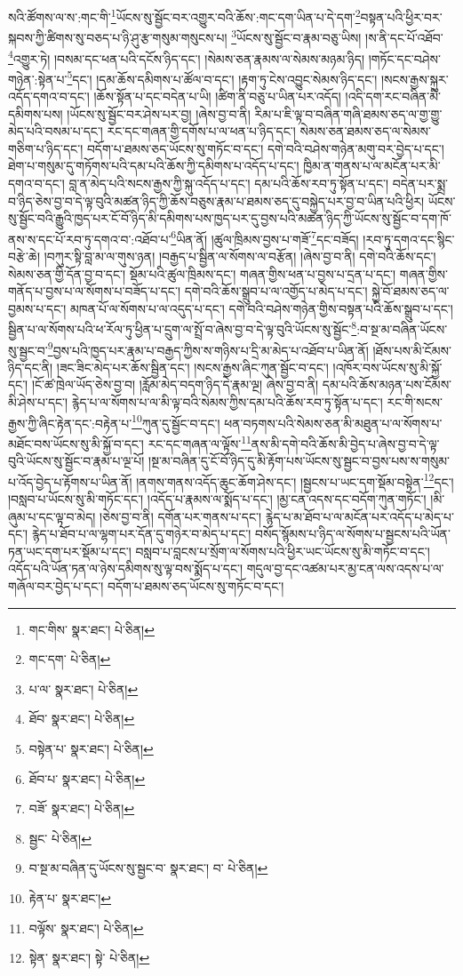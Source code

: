 སའི་ཚོགས་ལ་ས་:གང་གི་\footnote{གང་གིས་  སྣར་ཐང་།  པེ་ཅིན། }ཡོངས་སུ་སྦྱོང་བར་འགྱུར་བའི་ཆོས་:གང་དག་ཡིན་པ་དེ་དག་\footnote{གང་དག་  པེ་ཅིན། }བསྟན་པའི་ཕྱིར་བར་སྐབས་ཀྱི་ཚིགས་སུ་བཅད་པ་ཉི་ཤུ་རྩ་གསུམ་གསུངས་པ། \footnote{པ་ལ་  སྣར་ཐང་།  པེ་ཅིན། }ཡོངས་སུ་སྦྱོང་བ་རྣམ་བཅུ་ཡིས། །ས་ནི་དང་པོ་འཐོབ་\footnote{ཐོབ་  སྣར་ཐང་།  པེ་ཅིན། }འགྱུར་ཏེ། །བསམ་དང་ཕན་པའི་དངོས་ཉིད་དང་། །སེམས་ཅན་རྣམས་ལ་སེམས་མཉམ་ཉིད། །གཏོང་དང་བཤེས་གཉེན་:སྟེན་པ་\footnote{བསྟེན་པ་  སྣར་ཐང་།  པེ་ཅིན། }དང་། །དམ་ཆོས་དམིགས་པ་ཚོལ་བ་དང་། །རྟག་ཏུ་ངེས་འབྱུང་སེམས་ཉིད་དང་། །སངས་རྒྱས་སྐུར་འདོད་དགའ་བ་དང་། །ཆོས་སྟོན་པ་དང་བདེན་པ་ཡི། །ཚིག་ནི་བཅུ་པ་ཡིན་པར་འདོད། །འདི་དག་རང་བཞིན་མི་དམིགས་པས། །ཡོངས་སུ་སྦྱོང་བར་ཤེས་པར་བྱ། །ཞེས་བྱ་བ་ནི། རིམ་པ་ཇི་ལྟ་བ་བཞིན་གཞི་ཐམས་ཅད་ལ་གྱ་གྱུ་མེད་པའི་བསམ་པ་དང་། རང་དང་གཞན་གྱི་དགོས་པ་ལ་ཕན་པ་ཉིད་དང་། སེམས་ཅན་ཐམས་ཅད་ལ་སེམས་གཅིག་པ་ཉིད་དང་། བདོག་པ་ཐམས་ཅད་ཡོངས་སུ་གཏོང་བ་དང་། དགེ་བའི་བཤེས་གཉེན་མགུ་བར་བྱེད་པ་དང་། ཐེག་པ་གསུམ་དུ་གཏོགས་པའི་དམ་པའི་ཆོས་ཀྱི་དམིགས་པ་འདོད་པ་དང་། ཁྱིམ་ན་གནས་པ་ལ་མངོན་པར་མི་དགའ་བ་དང་། བླ་ན་མེད་པའི་སངས་རྒྱས་ཀྱི་སྐུ་འདོད་པ་དང་། དམ་པའི་ཆོས་རབ་ཏུ་སྟོན་པ་དང་། བདེན་པར་སྨྲ་བ་ཉིད་ཅེས་བྱ་བ་དེ་ལྟ་བུའི་མཚན་ཉིད་ཀྱི་ཆོས་བཅུས་རྣམ་པ་ཐམས་ཅད་དུ་བསྐྱེད་པར་བྱ་བ་ཡིན་པའི་ཕྱིར། ཡོངས་སུ་སྦྱོང་བའི་རྒྱུའི་ཁྱད་པར་ངོ་བོ་ཉིད་མི་དམིགས་པས་ཁྱད་པར་དུ་བྱས་པའི་མཚན་ཉིད་ཀྱི་ཡོངས་སུ་སྦྱོང་བ་དག་ཁོ་ནས་ས་དང་པོ་རབ་ཏུ་དགའ་བ་:འཐོབ་པ་\footnote{ཐོབ་པ་  སྣར་ཐང་།  པེ་ཅིན། }ཡིན་ནོ། །ཚུལ་ཁྲིམས་བྱས་པ་གཟོ་\footnote{བཟོ་  སྣར་ཐང་།  པེ་ཅིན། }དང་བཟོད། །རབ་ཏུ་དགའ་དང་སྙིང་བརྩེ་ཆེ། །བཀུར་སྟི་བླ་མ་ལ་གུས་ཉན། །བརྒྱད་པ་སྦྱིན་ལ་སོགས་ལ་བརྩོན། །ཞེས་བྱ་བ་ནི། དགེ་བའི་ཆོས་དང་། སེམས་ཅན་གྱི་དོན་བྱ་བ་དང་། སྡོམ་པའི་ཚུལ་ཁྲིམས་དང་། གཞན་གྱིས་ཕན་པ་བྱས་པ་དྲན་པ་དང་། གཞན་གྱིས་གནོད་པ་བྱས་པ་ལ་སོགས་པ་བཟོད་པ་དང་། དགེ་བའི་ཆོས་སྒྲུབ་པ་ལ་འགྱོད་པ་མེད་པ་དང་། སྐྱེ་བོ་ཐམས་ཅད་ལ་བྱམས་པ་དང་། མཁན་པོ་ལ་སོགས་པ་ལ་འདུད་པ་དང་། དགེ་བའི་བཤེས་གཉེན་གྱིས་བསྟན་པའི་ཆོས་སྒྲུབ་པ་དང་། སྦྱིན་པ་ལ་སོགས་པའི་ཕ་རོལ་ཏུ་ཕྱིན་པ་དྲུག་ལ་སྤྲོ་བ་ཞེས་བྱ་བ་དེ་ལྟ་བུའི་ཡོངས་སུ་སྦྱོང་\footnote{སྦྱང་  པེ་ཅིན། }:བ་སྔ་མ་བཞིན་ཡོངས་སུ་སྦྱང་བ་\footnote{བ་སྔ་མ་བཞིན་དུ་ཡོངས་སུ་སྦྱང་བ་  སྣར་ཐང་། བ་  པེ་ཅིན། }བྱས་པའི་ཁྱད་པར་རྣམ་པ་བརྒྱད་ཀྱིས་ས་གཉིས་པ་དྲི་མ་མེད་པ་འཐོབ་པ་ཡིན་ནོ། །ཐོས་པས་མི་ངོམས་ཉིད་དང་ནི། །ཟང་ཟིང་མེད་པར་ཆོས་སྦྱིན་དང་། །སངས་རྒྱས་ཞིང་ཀུན་སྦྱོང་བ་དང་། །འཁོར་བས་ཡོངས་སུ་མི་སྐྱོ་དང་། །ངོ་ཚ་ཁྲེལ་ཡོད་ཅེས་བྱ་བ། །རློམ་མེད་བདག་ཉིད་དེ་རྣམ་ལྔ། ཞེས་བྱ་བ་ནི། དམ་པའི་ཆོས་མཉན་པས་ངོམས་མི་ཤེས་པ་དང་། རྙེད་པ་ལ་སོགས་པ་ལ་མི་ལྟ་བའི་སེམས་ཀྱིས་དམ་པའི་ཆོས་རབ་ཏུ་སྟོན་པ་དང་། རང་གི་སངས་རྒྱས་ཀྱི་ཞིང་རྟེན་དང་:བརྟེན་པ་\footnote{རྟེན་པ་  སྣར་ཐང་། }ཀུན་དུ་སྦྱོང་བ་དང་། ཕན་བཏགས་པའི་སེམས་ཅན་མི་མཐུན་པ་ལ་སོགས་པ་མཐོང་བས་ཡོངས་སུ་མི་སྐྱོ་བ་དང་། རང་དང་གཞན་ལ་ལྟོས་\footnote{བལྟོས་  སྣར་ཐང་།  པེ་ཅིན། }ནས་མི་དགེ་བའི་ཆོས་མི་བྱེད་པ་ཞེས་བྱ་བ་དེ་ལྟ་བུའི་ཡོངས་སུ་སྦྱོང་བ་རྣམ་པ་ལྔ་པོ། །སྔ་མ་བཞིན་དུ་ངོ་བོ་ཉིད་དུ་མི་རྟོག་པས་ཡོངས་སུ་སྦྱང་བ་བྱས་པས་ས་གསུམ་པ་འོད་བྱེད་པ་རྟོགས་པ་ཡིན་ནོ། །ནགས་གནས་འདོད་ཆུང་ཆོག་ཤེས་དང་། །སྦྱངས་པ་ཡང་དག་སྡོམ་བསྟེན་\footnote{སྟེན་  སྣར་ཐང་། སྟེ་  པེ་ཅིན། }དང་། །བསླབ་པ་ཡོངས་སུ་མི་གཏོང་དང་། །འདོད་པ་རྣམས་ལ་སྨོད་པ་དང་། །མྱ་ངན་འདས་དང་བདོག་ཀུན་གཏོང་། །མི་ཞུམ་པ་དང་ལྟ་བ་མེད། །ཅེས་བྱ་བ་ནི། དགོན་པར་གནས་པ་དང་། རྙེད་པ་མ་ཐོབ་པ་ལ་མངོན་པར་འདོད་པ་མེད་པ་དང་། རྙེད་པ་ཐོབ་པ་ལ་ལྷག་པར་དོན་དུ་གཉེར་བ་མེད་པ་དང་། བསོད་སྙོམས་པ་ཉིད་ལ་སོགས་པ་སྦྱངས་པའི་ཡོན་ཏན་ཡང་དག་པར་སྡོམ་པ་དང་། བསླབ་པ་བླངས་པ་སྲོག་ལ་སོགས་པའི་ཕྱིར་ཡང་ཡོངས་སུ་མི་གཏོང་བ་དང་། འདོད་པའི་ཡོན་ཏན་ལ་ཉེས་དམིགས་སུ་ལྟ་བས་སྨོད་པ་དང་། གདུལ་བྱ་དང་འཚམ་པར་མྱ་ངན་ལས་འདས་པ་ལ་གཞོལ་བར་བྱེད་པ་དང་། བདོག་པ་ཐམས་ཅད་ཡོངས་སུ་གཏོང་བ་དང་། 